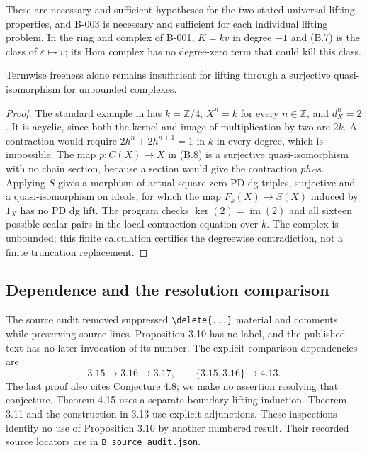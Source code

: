 These are necessary-and-sufficient hypotheses for the two stated
universal lifting properties, and B-003 is necessary and sufficient
for each individual lifting problem.  In the ring and complex of B-001,
$K=kv$ in degree $-1$ and \textup{(B.7)} is the class of
$\varepsilon\mapsto v$; its Hom complex has no degree-zero term that
could kill this class.

\begin{proposition}
\label{B005}
Termwise freeness alone remains insufficient for lifting through a
surjective quasi-isomorphism for unbounded complexes.
\end{proposition}

\begin{proof}
The standard example in \cite[p.~124, example (1) and the following
definition]{B_Spaltenstein1988} has $k=\mathbb Z/4$,
$X^n=k$ for every $n\in\mathbb Z$, and $d_X^n=2$.
It is acyclic, since both the kernel and image of multiplication by two
are $2k$.  A contraction would require
$2h^n+2h^{n+1}=1$ in $k$ in every degree, which is impossible.
The map $p:C(X)\to X$ in \textup{(B.8)} is a surjective
quasi-isomorphism with no chain section, because a section would give
the contraction $ph_Cs$.
Applying $S$ gives a morphism of actual square-zero PD dg triples,
surjective and a quasi-isomorphism on ideals, for which the map
$F_k(X)\to S(X)$ induced by $1_X$ has no PD dg lift.
The program checks $\ker(2)=\operatorname{im}(2)$ and all sixteen
possible scalar pairs in the local contraction equation over $k$.
The complex is unbounded; this finite calculation certifies the
degreewise contradiction, not a finite truncation replacement.
\end{proof}

\subsection{Dependence and the resolution comparison}

The source audit removed suppressed \verb|\delete{...}| material and
comments while preserving source lines.  Proposition 3.10 has no label,
and the published text has no later invocation of its number.
The explicit comparison dependencies are
\[
3.15\longrightarrow3.16\longrightarrow3.17,
\qquad \{3.15,3.16\}\longrightarrow4.13.
\]
The last proof also cites Conjecture 4.8; we make no assertion resolving
that conjecture.  Theorem 4.15 uses a separate boundary-lifting induction.
Theorem 3.11 and the construction in 3.13 use explicit adjunctions.
These inspections identify no use of Proposition 3.10 by another
numbered result.  Their recorded source locators are in
\texttt{B\_source\_audit.json}.

